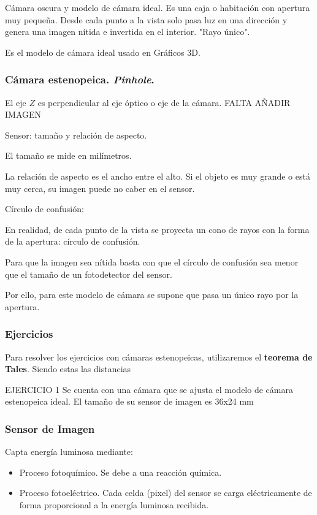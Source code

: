 \documentclass[a4paper]{book}
\begin{document}
Cámara oscura y modelo de cámara ideal. Es una caja o habitación con apertura muy pequeña. Desde cada punto a la vista solo pasa luz en una dirección y genera una imagen nítida e invertida en el interior. "Rayo único".

Es el modelo de cámara ideal usado en Gráficos 3D.



\subsubsection{Cámara estenopeica. \textit{Pinhole}.}

El eje $Z$ es perpendicular al eje óptico o eje de la cámara. FALTA AÑADIR IMAGEN

Sensor: tamaño y relación de aspecto.

El tamaño se mide en milímetros.

La relación de aspecto es el ancho entre el alto. Si el objeto es muy grande o está muy cerca, su imagen puede no caber en el sensor.

Círculo de confusión:

En realidad, de cada punto de la vista se proyecta un cono de rayos con la forma de la apertura: círculo de confusión.

Para que la imagen sea nítida basta con que el círculo de confusión sea menor que el tamaño de un fotodetector del sensor.

Por ello, para este modelo de cámara se supone que pasa un único rayo por la apertura.

\subsubsection{Ejercicios}

Para resolver los ejercicios con cámaras estenopeicas, utilizaremos el \textbf{teorema de Tales}. Siendo estas las distancias

EJERCICIO 1
Se cuenta con una cámara que se ajusta el modelo de cámara estenopeica ideal. El tamaño de su sensor de imagen es 36x24 mm

\subsubsection{Sensor de Imagen}

Capta energía luminosa mediante:
\begin{itemize}
	\item Proceso fotoquímico. Se debe a una reacción química.
	\item Proceso fotoeléctrico. Cada celda (pixel) del sensor se carga eléctricamente de forma proporcional a la energía luminosa recibida.
\end{itemize}
\end{document}
